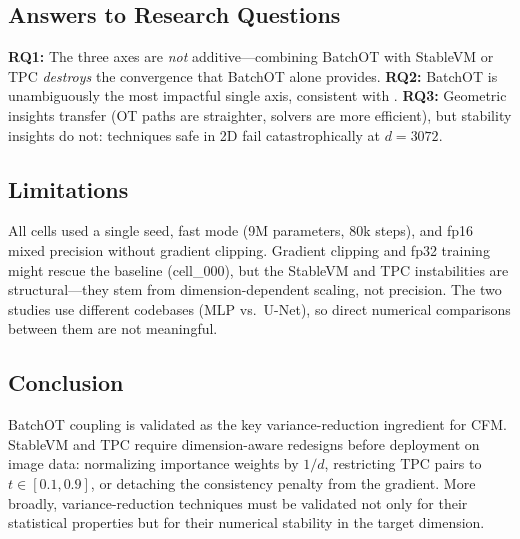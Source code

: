 \subsection{Answers to Research Questions}

\textbf{RQ1:} The three axes are \emph{not} additive---combining BatchOT with StableVM or TPC \emph{destroys} the convergence that BatchOT alone provides. \textbf{RQ2:} BatchOT is unambiguously the most impactful single axis, consistent with \citet{tong2024improving}. \textbf{RQ3:} Geometric insights transfer (OT paths are straighter, solvers are more efficient), but stability insights do not: techniques safe in 2D fail catastrophically at $d{=}3072$.

\subsection{Limitations}

All cells used a single seed, fast mode (9M parameters, 80k steps), and fp16 mixed precision without gradient clipping. Gradient clipping and fp32 training might rescue the baseline (cell\_000), but the StableVM and TPC instabilities are structural---they stem from dimension-dependent scaling, not precision. The two studies use different codebases (MLP vs.\ U-Net), so direct numerical comparisons between them are not meaningful.

\subsection{Conclusion}

BatchOT coupling is validated as the key variance-reduction ingredient for CFM. StableVM and TPC require dimension-aware redesigns before deployment on image data: normalizing importance weights by $1/d$, restricting TPC pairs to $t \in [0.1, 0.9]$, or detaching the consistency penalty from the gradient. More broadly, variance-reduction techniques must be validated not only for their statistical properties but for their numerical stability in the target dimension.
